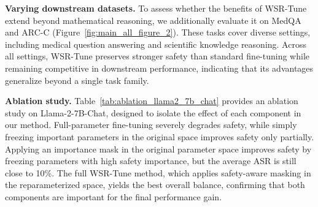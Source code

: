 \documentclass{article}
\newcommand{\kms}[1]{{\leavevmode\color{blue}[MS: #1]}}
\begin{document}
\textbf{Varying downstream datasets.} 
To assess whether the benefits of WSR-Tune extend beyond mathematical reasoning, we additionally evaluate it on MedQA and ARC-C (Figure~\ref{fig:main_all_figure_2}). These tasks cover diverse settings, including medical question answering and scientific knowledge reasoning. Across all settings, WSR-Tune preserves stronger safety than standard fine-tuning while remaining competitive in downstream performance, indicating that its advantages generalize beyond a single task family.





\textbf{Ablation study.}
 Table~\ref{tab:ablation_llama2_7b_chat} provides an ablation study on Llama-2-7B-Chat, designed to isolate the effect of each component in our method. Full-parameter fine-tuning severely degrades safety, while simply freezing important parameters in the original space improves safety only partially. Applying an importance mask in the original parameter space improves safety by freezing parameters with high safety importance, but the average ASR is still  close to 10\%. 
 The full WSR-Tune method, which applies safety-aware masking in the reparameterized space, yields the best overall balance, confirming that both components are important for the final performance gain.
\end{document}
